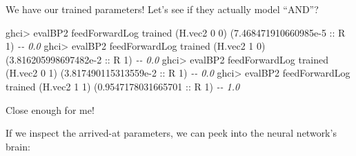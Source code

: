 \documentclass[]{article}
\newenvironment{Shaded}{}{}
\newcommand{\CommentTok}[1]{\textcolor[rgb]{0.38,0.63,0.69}{\textit{#1}}}
\newcommand{\DataTypeTok}[1]{\textcolor[rgb]{0.56,0.13,0.00}{#1}}
\newcommand{\DecValTok}[1]{\textcolor[rgb]{0.25,0.63,0.44}{#1}}
\newcommand{\FloatTok}[1]{\textcolor[rgb]{0.25,0.63,0.44}{#1}}
\newcommand{\FunctionTok}[1]{\textcolor[rgb]{0.02,0.16,0.49}{#1}}
\newcommand{\KeywordTok}[1]{\textcolor[rgb]{0.00,0.44,0.13}{\textbf{#1}}}
\newcommand{\NormalTok}[1]{#1}
\newcommand{\OperatorTok}[1]{\textcolor[rgb]{0.40,0.40,0.40}{#1}}
\newcommand{\OtherTok}[1]{\textcolor[rgb]{0.00,0.44,0.13}{#1}}
\begin{document}
\begin{Shaded}
\end{Shaded}

We have our trained parameters! Let's see if they actually model ``AND''?

\begin{Shaded}
\begin{Highlighting}[]
\NormalTok{ghci}\OperatorTok{>}\NormalTok{ evalBP2 feedForwardLog trained (H.vec2 }\DecValTok{0} \DecValTok{0}\NormalTok{)}
\NormalTok{(}\FloatTok{7.468471910660985e{-}5}\OtherTok{ ::} \DataTypeTok{R} \DecValTok{1}\NormalTok{)       }\CommentTok{{-}{-} 0.0}
\NormalTok{ghci}\OperatorTok{>}\NormalTok{ evalBP2 feedForwardLog trained (H.vec2 }\DecValTok{1} \DecValTok{0}\NormalTok{)}
\NormalTok{(}\FloatTok{3.816205998697482e{-}2}\OtherTok{ ::} \DataTypeTok{R} \DecValTok{1}\NormalTok{)       }\CommentTok{{-}{-} 0.0}
\NormalTok{ghci}\OperatorTok{>}\NormalTok{ evalBP2 feedForwardLog trained (H.vec2 }\DecValTok{0} \DecValTok{1}\NormalTok{)}
\NormalTok{(}\FloatTok{3.817490115313559e{-}2}\OtherTok{ ::} \DataTypeTok{R} \DecValTok{1}\NormalTok{)       }\CommentTok{{-}{-} 0.0}
\NormalTok{ghci}\OperatorTok{>}\NormalTok{ evalBP2 feedForwardLog trained (H.vec2 }\DecValTok{1} \DecValTok{1}\NormalTok{)}
\NormalTok{(}\FloatTok{0.9547178031665701}\OtherTok{ ::} \DataTypeTok{R} \DecValTok{1}\NormalTok{)         }\CommentTok{{-}{-} 1.0}
\end{Highlighting}
\end{Shaded}

Close enough for me!

If we inspect the arrived-at parameters, we can peek into the neural network's
brain:
\end{document}
